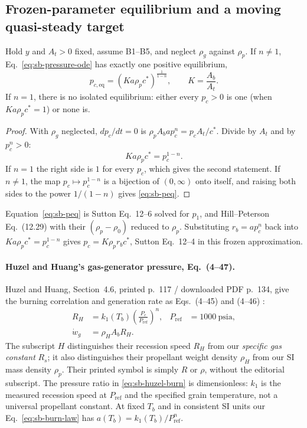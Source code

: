 \subsection{Frozen-parameter equilibrium and a moving quasi-steady target}
\begin{proposition}\label{prop:sb-equilibrium}
Hold $y$ and $A_t>0$ fixed, assume B1--B5, and neglect $\rho_g$ against $\rho_p$. If
$n\ne1$, Eq.~\eqref{eq:sb-pressure-ode} has exactly one positive
equilibrium,
\begin{equation}\label{eq:sb-peq}
 p_{c,\mathrm{eq}}=\left(K a\rho_pc^*\right)^{\frac{1}{1-n}},\qquad K=\frac{A_b}{A_t}.
\end{equation}
If $n=1$, there is no isolated equilibrium: either every $p_c>0$ is one
(when $Ka\rho_pc^*=1$) or none is.
\end{proposition}
\begin{proof}
With $\rho_g$ neglected, $dp_c/dt=0$ is
$\rho_pA_bap_c^n=p_cA_t/c^*$. Divide by $A_t$ and by $p_c^n>0$:
\[
 Ka\rho_pc^*=p_c^{1-n}.
\]
If $n=1$ the right side is $1$ for every $p_c$, which gives the second
statement. If $n\ne1$, the map $p_c\mapsto p_c^{1-n}$ is a bijection of
$(0,\infty)$ onto itself, and raising both sides to the power $1/(1-n)$ gives
\eqref{eq:sb-peq}.
\end{proof}
Equation~\eqref{eq:sb-peq} is Sutton Eq.~12--6 solved for $p_1$, and
Hill--Peterson Eq.~(12.29) with their $(\rho_p-\rho_0)$ reduced to
$\rho_p$. Substituting $r_b=ap_c^n$ back into $Ka\rho_pc^*=p_c^{1-n}$ gives
$p_c=K\rho_p r_bc^*$, Sutton Eq.~12--4 in this frozen approximation.

\paragraph{Huzel and Huang's gas-generator pressure, Eq.~(4--47).}
Huzel and Huang, Section~4.6, printed p.~117 / downloaded PDF p.~134,
give the burning correlation and generation rate as Eqs.~(4--45) and
(4--46) \cite{huzelhuang}:
\begin{align}
 R_H&=k_1(T_b)\left(\frac{P_c}{P_{\mathrm{ref}}}\right)^n,
 &P_{\mathrm{ref}}&=1000\ \mathrm{psia},
 \label{eq:sb-huzel-burn}\\
 \dot w_g&=\rho_H A_bR_H.
 \label{eq:sb-huzel-generation}
\end{align}
The subscript $H$ distinguishes their recession speed $R_H$ from our
\emph{specific gas constant} $R_s$; it also distinguishes their propellant
weight density $\rho_H$ from our SI mass density $\rho_p$. Their printed
symbol is simply $R$ or $\rho$, without the editorial subscript.
The pressure ratio in \eqref{eq:sb-huzel-burn} is dimensionless:
$k_1$ is the measured recession speed at $P_{\mathrm{ref}}$ and the
specified grain temperature, not a universal propellant constant.
At fixed $T_b$ and in consistent SI units our Eq.~\eqref{eq:sb-burn-law}
has $a(T_b)=k_1(T_b)/P_{\mathrm{ref}}^n$.


